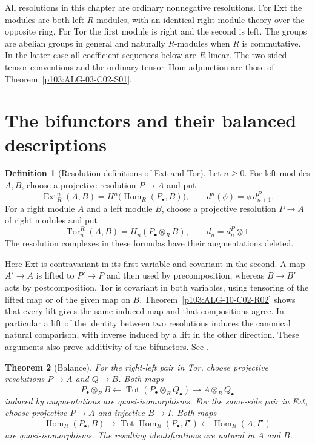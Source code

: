\documentclass[11pt,oneside,openany]{book}
\newtheorem{theorem}{Theorem}[chapter]
\theoremstyle{definition}
\newtheorem{definition}[theorem]{Definition}
\theoremstyle{remark}
\begin{document}
All resolutions in this chapter are ordinary nonnegative resolutions.
For Ext the modules are both left \(R\)-modules, with an identical
right-module theory over the opposite ring. For Tor the first module
is right and the second is left. The groups are abelian groups in
general and naturally \(R\)-modules when \(R\) is commutative.
In the latter case all coefficient sequences below are \(R\)-linear.
The two-sided tensor conventions and the ordinary tensor--Hom
adjunction are those of Theorem~\ref{p103:ALG-03-C02-S01}.

\section{The bifunctors and their balanced descriptions}

\begin{definition}[Resolution definitions of Ext and Tor]
\label{p103:ALG-10-C03-R01}
Let \(n\geq0\). For left modules \(A,B\), choose a projective
resolution \(P\to A\) and put
\[
 \operatorname{Ext}_R^n(A,B)=
 H^n\!\bigl(\operatorname{Hom}_R(P_\bullet,B)\bigr),\qquad
 d^n(\phi)=\phi\,d_{n+1}^P .
\]
For a right module \(A\) and a left module \(B\), choose a projective
resolution \(P\to A\) of right modules and put
\[
 \operatorname{Tor}^R_n(A,B)=H_n(P_\bullet\otimes_R B),
 \qquad d_n=d_n^P\otimes 1 .
\]
The resolution complexes in these formulas have their augmentations
deleted.
\end{definition}

Here Ext is contravariant in its first variable and covariant in
the second. A map \(A'\to A\) is lifted to \(P'\to P\) and then
used by precomposition, whereas \(B\to B'\) acts by
postcomposition. Tor is covariant in both variables, using
tensoring of the lifted map or of the given map on \(B\).
Theorem~\ref{p103:ALG-10-C02-R02} shows that every lift gives the
same induced map and that compositions agree. In particular a
lift of the identity between two resolutions induces the canonical
natural comparison, with inverse induced by a lift in the other
direction. These arguments also prove additivity of the
bifunctors. See \cite[\S\S2.4--2.5 and 3.1--3.3]{weibel}.

\begin{theorem}[Balance]
\label{p103:ALG-10-C03-S01}
For the right-left pair in Tor, choose projective resolutions
\(P\to A\) and \(Q\to B\). Both maps
\[
 P_\bullet\otimes_R B
 \longleftarrow\operatorname{Tot}(P_\bullet\otimes_R Q_\bullet)
 \longrightarrow A\otimes_R Q_\bullet
\]
induced by augmentations are quasi-isomorphisms. For the same-side
pair in Ext, choose projective \(P\to A\) and injective \(B\to I\).
Both maps
\[
 \operatorname{Hom}_R(P_\bullet,B)
 \longrightarrow\operatorname{Tot}\operatorname{Hom}_R(P_\bullet,I^\bullet)
 \longleftarrow\operatorname{Hom}_R(A,I^\bullet)
\]
are quasi-isomorphisms. The resulting identifications are natural
in \(A\) and \(B\).
\end{theorem}
\end{document}
